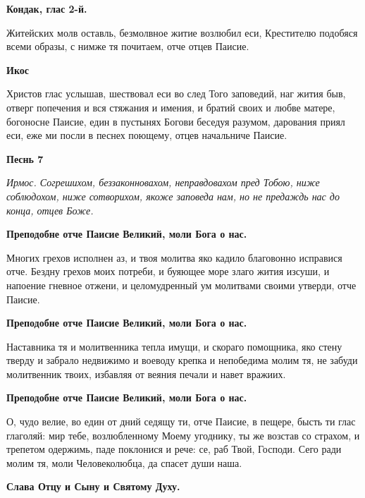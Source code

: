 \bfseries Кондак, глас 2-й.\normalfont{} 




Житейских молв оставль, безмолвное житие возлюбил еси, Крестителю подобяся всеми образы, с нимже тя почитаем, отче отцев Паисие. 




\bfseries Икос\normalfont{}

Христов глас услышав, шествовал еси во след Того заповедий, наг жития быв, отверг попечения и вся стяжания и имения, и братий своих и любве матере, богоносне Паисие, един в пустынях Богови беседуя разумом, дарования приял еси, еже ми посли в песнех поющему, отцев начальниче Паисие. 




\bfseries Песнь 7\normalfont{} 




\itshape Ирмос\normalfont{}. Согрешихом, беззаконновахом, неправдовахом пред Тобою, ниже соблюдохом, ниже сотворихом, якоже заповеда нам, но не предаждь нас до конца, отцев Боже. 




\bfseries Преподобне отче Паисие Великий, моли Бога о нас.\normalfont{} 




Многих грехов исполнен аз, и твоя молитва яко кадило благовонно исправися отче. Бездну грехов моих потреби, и буяющее море злаго жития изсуши, и напоение гневное отжени, и целомудренный ум молитвами своими утверди, отче Паисие. 




\bfseries Преподобне отче Паисие Великий, моли Бога о нас.\normalfont{}


Наставника тя и молитвенника тепла имущи, и скораго помощника, яко стену тверду и забрало недвижимо и воеводу крепка и непобедима молим тя, не забуди молитвенник твоих, избавляя от веяния печали и навет вражиих. 




\bfseries Преподобне отче Паисие Великий, моли Бога о нас.\normalfont{}


О, чудо велие, во един от дний седящу ти, отче Паисие, в пещере, бысть ти глас глаголяй: мир тебе, возлюбленному Моему угоднику, ты же возстав со страхом, и трепетом одержимь, паде поклонися и рече: се, раб Твой, Господи. Сего ради молим тя, моли Человеколюбца, да спасет души наша. 




\bfseries Слава Отцу и Сыну и Святому Духу\normalfont{}. 




